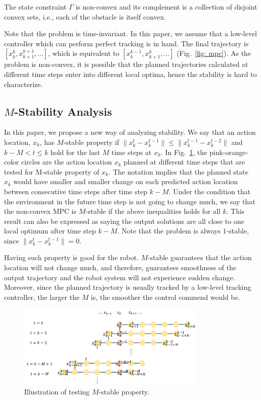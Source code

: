 \documentclass{ifacconf}
\begin{document}
\begin{assum}[Constraint]
The state constraint $\Gamma$ is non-convex and its complement is a collection of disjoint convex sets, i.e., each of the obstacle is itself convex.
\end{assum}

Note that the problem is time-invariant. In this paper, we assume that a low-level controller which can perform perfect tracking is in hand. The final trajectory is $[x_k^k,x_{k+1}^{k+1},\ldots]$, which is equivalent to $[x_{k}^{k-1},x_{k+1}^{k},\ldots]$ (Fig.~\ref{fig: mpc}). As the problem is non-convex, it is possible that the planned trajectories calculated at different time steps enter into different local optima, hence the stability is hard to characterize. 

\subsection{$M$-Stability Analysis}
In this paper, we propose a new way of analyzing stability.
We say that an action location, $x_{k}$, has $M$-stable property if $\|x_{k}^t-x_k^{t-1}\|\leq \|x_k^{t-1}-x_k^{t-2}\|$ and $k-M< t\leq k$ hold for the last $M$ time steps at $x_{k}$. In Fig.~\ref{fig:m-stable}, the pink-orange-color circles are the action location $x_{k}$ planned at different time steps that are  tested for M-stable property of $x_{k}$. The notation implies that the planned state $x_k$ would have smaller and smaller change on each predicted action location between consecutive time steps after time step $k-M$. Under the condition that the environment in the future time step is not going to change much, we say that the non-convex MPC is $M$-stable if the above inequalities holds for all $k$. This result can also be expressed as saying the output solutions are all close to one local optimum after time step $k-M$. Note that the problem is always $1$-stable, since $\|x_{k}^t-x_k^{t-1}\|=0$.

Having such property is good for the robot. $M$-stable guarantees that the action location will not change much, and therefore, guarantees smoothness of the output trajectory and the robot system will not experience sudden change. Moreover, since the planned trajectory is usually tracked by a low-level tracking controller, the larger the $M$ is, the smoother the control commend would be.

\begin{figure}[t]
\begin{center}
\includegraphics[width=9cm]{src/Mstable.png}
\caption{Illustration of testing $M$-stable property.}
\label{fig:m-stable}
\end{center}
\end{figure}
\end{document}
